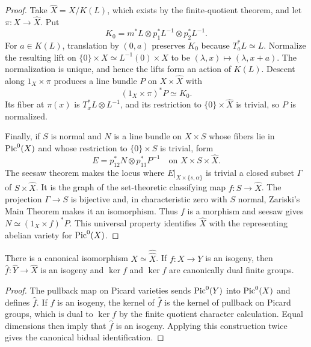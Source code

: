 \begin{proof}
Take $\widehat X=X/K(L)$, which exists by the finite-quotient theorem, and
let $\pi:X\to\widehat X$.  Put
\[
 K_0=m^*L\otimes p_1^*L^{-1}\otimes p_2^*L^{-1}.
\]
For $a\in K(L)$, translation by $(0,a)$ preserves $K_0$ because
$T_a^*L\simeq L$.  Normalize the resulting lift on
$\{0\}\times X\simeq L^{-1}(0)\times X$ to be
$(\lambda,x)\mapsto(\lambda,x+a)$.  The normalization is unique, and hence
the lifts form an action of $K(L)$.  Descent along $1_X\times\pi$ produces a
line bundle $P$ on $X\times\widehat X$ with
\[
 (1_X\times\pi)^*P\simeq K_0.
\]
Its fiber at $\pi(x)$ is $T_x^*L\otimes L^{-1}$, and its restriction to
$\{0\}\times\widehat X$ is trivial, so $P$ is normalized.

Finally, if $S$ is normal and $N$ is a line bundle on $X\times S$ whose
fibers lie in $\operatorname{Pic}^0(X)$ and whose restriction to $\{0\}\times S$ is trivial,
form
\[
 E=p_{12}^*N\otimes p_{13}^*P^{-1}
 \quad\text{on }X\times S\times\widehat X.
\]
The seesaw theorem makes the locus where
$E|_{X\times\{s,\alpha\}}$ is trivial a closed subset $\Gamma$ of
$S\times\widehat X$.  It is the graph of the set-theoretic classifying map
$f:S\to\widehat X$.  The projection $\Gamma\to S$ is bijective and, in
characteristic zero with $S$ normal, Zariski's Main Theorem makes it an
isomorphism.  Thus $f$ is a morphism and seesaw gives
$N\simeq(1_X\times f)^*P$.  This universal property identifies
$\widehat X$ with the representing abelian variety for $\operatorname{Pic}^0(X)$.
\end{proof}

\begin{proposition}[Biduality]
\label{mumford-prop-biduality-char-zero}
There is a canonical isomorphism $X\simeq\widehat{\widehat X}$.
If $f:X\to Y$ is an isogeny, then $\widehat f:\widehat Y\to\widehat X$ is an
isogeny and $\ker f$ and $\ker\widehat f$ are canonically dual finite groups.
\end{proposition}
\begin{proof}
The pullback map on Picard varieties sends $\operatorname{Pic}^0(Y)$ into $\operatorname{Pic}^0(X)$ and
defines $\widehat f$. If $f$ is an isogeny, the kernel of $\widehat f$ is the
kernel of pullback on Picard groups, which is dual to $\ker f$ by the finite
quotient character calculation. Equal dimensions then imply that $\widehat f$
is an isogeny. Applying this construction twice gives the canonical bidual
identification.
\end{proof}

